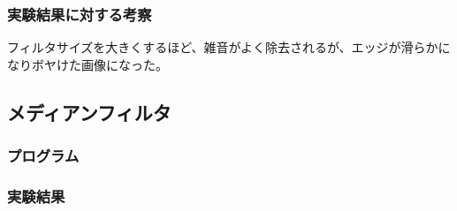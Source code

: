 \documentclass[a4paper,10pt,uplatex,dvipdfmx]{jsarticle}
\begin{document}
\subsubsection{実験結果に対する考察}
フィルタサイズを大きくするほど、雑音がよく除去されるが、エッジが滑らかになりボヤけた画像になった。

\subsection{メディアンフィルタ}
\subsubsection{プログラム}


\subsubsection{実験結果}
\end{document}

